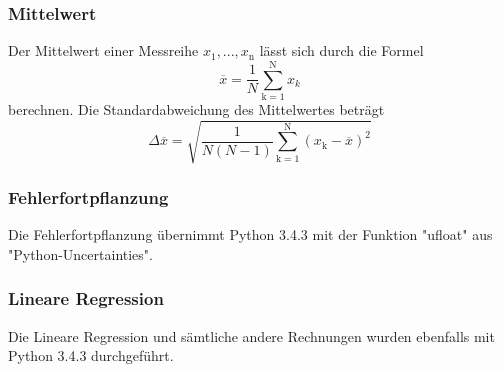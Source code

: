 \subsubsection{Mittelwert}
Der Mittelwert einer Messreihe $x_\text{1}, ... ,x_\text{n}$ lässt sich durch die Formel
\begin{equation}
	\overline{x} = \frac{1}{N} \sum_{\text{k}=1}^\text{N} x_k
	\label{eqn:ave}
\end{equation}
berechnen. Die Standardabweichung des Mittelwertes beträgt
\begin{equation}
	\Delta \overline{x} = \sqrt{ \frac{1}{N(N-1)} \sum_{\text{k}=1}^\text{N} (x_\text{k} - \overline{x})^2}
	\label{eqn:std}
\end{equation}

\subsubsection{Fehlerfortpflanzung}
Die Fehlerfortpflanzung übernimmt Python 3.4.3 mit der Funktion "ufloat" aus "Python-Uncertainties".

\subsubsection{Lineare Regression}
Die Lineare Regression und sämtliche andere Rechnungen wurden ebenfalls mit Python 3.4.3 durchgeführt.
